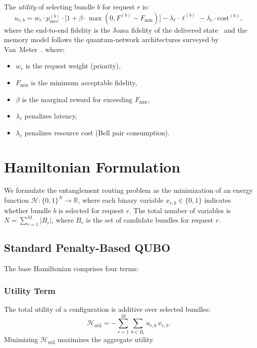 \documentclass[10pt,a4paper]{article}
\newcommand{\R}{\mathbb{R}}
\newcommand{\calH}{\mathcal{H}}
\begin{document}
The \emph{utility} of selecting bundle $b$ for request $r$ is:
\begin{equation}
  u_{r,b} = w_r \cdot p_{\text{succ}}^{(b)}
    \cdot \bigl[1 + \beta \cdot \max(0, F^{(b)} - F_{\min})\bigr]
    - \lambda_\ell \cdot \ell^{(b)} - \lambda_c \cdot
    \text{cost}^{(b)},
\label{eq:utility}
\end{equation}
where the end-to-end fidelity is the Jozsa fidelity of the delivered
state~\cite{jozsa1994fidelity} and the memory model follows the
quantum-network architectures surveyed by Van~Meter~\cite{vanmeter2014quantum}.
where:
\begin{itemize}
  \item $w_r$ is the request weight (priority),
  \item $F_{\min}$ is the minimum acceptable fidelity,
  \item $\beta$ is the marginal reward for exceeding $F_{\min}$,
  \item $\lambda_\ell$ penalizes latency,
  \item $\lambda_c$ penalizes resource cost (Bell pair consumption).
\end{itemize}

\section{Hamiltonian Formulation}
\label{sec:hamiltonian}

We formulate the entanglement routing problem as the minimization of
an energy function $\calH : \{0,1\}^N \to \R$, where each binary variable
$x_{r,b} \in \{0,1\}$ indicates whether bundle $b$ is selected for
request $r$.  The total number of variables is
$N = \sum_{r=1}^M |B_r|$, where $B_r$ is the set of candidate
bundles for request $r$.

\subsection{Standard Penalty-Based QUBO}
\label{sec:standard-qubo}

The base Hamiltonian comprises four terms:

\subsubsection{Utility Term}
The total utility of a configuration is additive over selected bundles:
\begin{equation}
  \calH_{\text{util}} = -\sum_{r=1}^M \sum_{b \in B_r} u_{r,b} \, x_{r,b}.
\end{equation}
Minimizing $\calH_{\text{util}}$ maximizes the aggregate utility.
\end{document}
